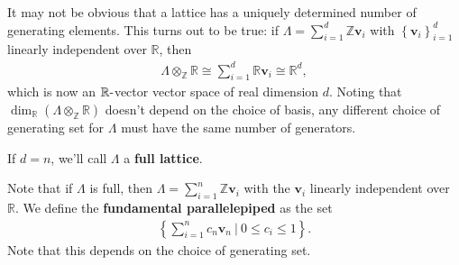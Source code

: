 \begin{remark}

It may not be obvious that a lattice has a uniquely determined number of
generating elements. This turns out to be true: if
\(\Lambda = \sum_{i=1}^d {\mathbb{Z}}\mathbf{v}_i\) with
\(\left\{{ \mathbf{v}_i }\right\}_{i=1}^d\) linearly independent over
\({\mathbb{R}}\), then
\begin{align*}
\Lambda\otimes_{\mathbb{Z}}{\mathbb{R}}\cong \sum_{i=1}^d {\mathbb{R}}\mathbf{v}_i \cong {\mathbb{R}}^d 
,\end{align*}
which is now an \({\mathbb{R}}{\hbox{-}}\)vector vector space of real
dimension \(d\). Noting that
\(\dim_{\mathbb{R}}(\Lambda\otimes_{\mathbb{Z}}{\mathbb{R}})\) doesn't
depend on the choice of basis, any different choice of generating set
for \(\Lambda\) must have the same number of generators.

\end{remark}

\begin{definition}

If \(d=n\), we'll call \(\Lambda\) a \textbf{full lattice}.

\end{definition}

\begin{definition}

Note that if \(\Lambda\) is full, then
\(\Lambda= \sum_{i=1}^n {\mathbb{Z}}\mathbf{v}_i\) with the
\(\mathbf{v}_i\) linearly independent over \({\mathbb{R}}\). We define
the \textbf{fundamental parallelepiped} as the set
\begin{align*}
\left\{{ \sum_{i=1}^n c_n \mathbf{v}_n {~\mathrel{\Big|}~}0 \leq c_i \leq 1}\right\} 
.\end{align*}
Note that this depends on the choice of generating set.

\end{definition}

